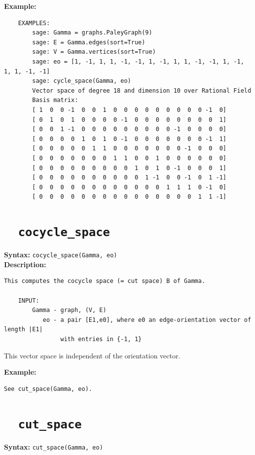 \documentclass{article}
\begin{document}
\textbf{Example:}
\begin{verbatim}
    EXAMPLES:
        sage: Gamma = graphs.PaleyGraph(9)
        sage: E = Gamma.edges(sort=True)
        sage: V = Gamma.vertices(sort=True)
        sage: eo = [1, -1, 1, 1, -1, -1, 1, -1, 1, 1, -1, -1, 1, -1, 1, 1, -1, -1]
        sage: cycle_space(Gamma, eo)
        Vector space of degree 18 and dimension 10 over Rational Field
        Basis matrix:
        [ 1  0  0 -1  0  0  1  0  0  0  0  0  0  0  0  0 -1  0]
        [ 0  1  0  1  0  0  0  0 -1  0  0  0  0  0  0  0  0  1]
        [ 0  0  1 -1  0  0  0  0  0  0  0  0  0 -1  0  0  0  0]
        [ 0  0  0  0  1  0  1  0 -1  0  0  0  0  0  0  0 -1  1]
        [ 0  0  0  0  0  1  1  0  0  0  0  0  0  0 -1  0  0  0]
        [ 0  0  0  0  0  0  0  1  1  0  0  1  0  0  0  0  0  0]
        [ 0  0  0  0  0  0  0  0  0  1  0  1  0 -1  0  0  0  1]
        [ 0  0  0  0  0  0  0  0  0  0  1 -1  0  0 -1  0  1 -1]
        [ 0  0  0  0  0  0  0  0  0  0  0  0  1  1  1  0 -1  0]
        [ 0  0  0  0  0  0  0  0  0  0  0  0  0  0  0  1  1 -1]
\end{verbatim}

\section{\tt \ \ cocycle\_space}

\textbf{Syntax:} \verb}cocycle_space(Gamma, eo)}\\

\textbf{Description:}
\begin{verbatim}
This computes the cocycle space (= cut space) B of Gamma.

    INPUT:
        Gamma - graph, (V, E)
           eo - a pair [E1,e0], where e0 an edge-orientation vector of length |E1|
                with entries in {-1, 1}

\end{verbatim}

This vector space is independent of the orientation vector.

\textbf{Example:}
\begin{verbatim}
See cut_space(Gamma, eo).
\end{verbatim}

\section{\tt \ \ cut\_space}

\textbf{Syntax:} \verb}cut_space(Gamma, eo)}\\
\end{document}
